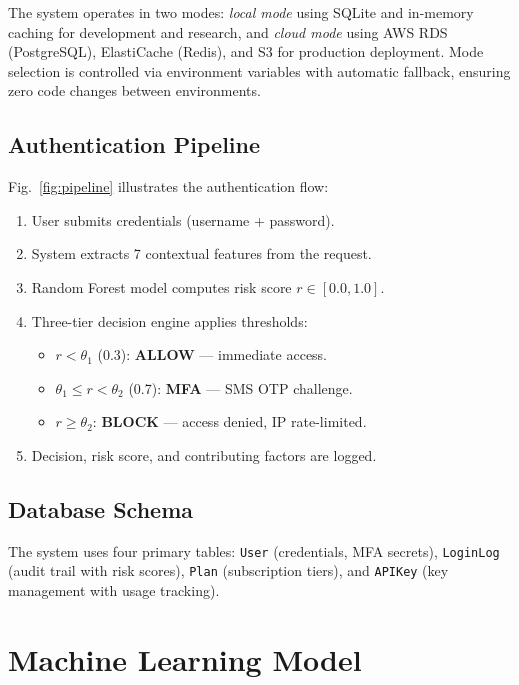 \documentclass[conference]{IEEEtran}
\begin{document}
The system operates in two modes: \textit{local mode} using SQLite and in-memory caching for development and research, and \textit{cloud mode} using AWS RDS (PostgreSQL), ElastiCache (Redis), and S3 for production deployment. Mode selection is controlled via environment variables with automatic fallback, ensuring zero code changes between environments.

\subsection{Authentication Pipeline}

Fig.~\ref{fig:pipeline} illustrates the authentication flow:

\begin{enumerate}
\item User submits credentials (username + password).
\item System extracts 7 contextual features from the request.
\item Random Forest model computes risk score $r \in [0.0, 1.0]$.
\item Three-tier decision engine applies thresholds:
\begin{itemize}
\item $r < \theta_1$ (0.3): \textbf{ALLOW} --- immediate access.
\item $\theta_1 \leq r < \theta_2$ (0.7): \textbf{MFA} --- SMS OTP challenge.
\item $r \geq \theta_2$: \textbf{BLOCK} --- access denied, IP rate-limited.
\end{itemize}
\item Decision, risk score, and contributing factors are logged.
\end{enumerate}

\subsection{Database Schema}

The system uses four primary tables: \texttt{User} (credentials, MFA secrets), \texttt{LoginLog} (audit trail with risk scores), \texttt{Plan} (subscription tiers), and \texttt{APIKey} (key management with usage tracking).

\section{Machine Learning Model}
\end{document}
